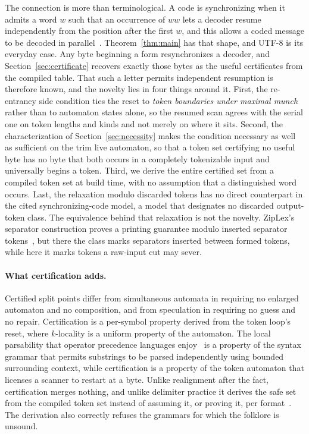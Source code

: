 \documentclass[11pt,a4paper]{article}
\theoremstyle{definition}
\theoremstyle{plain}
\begin{document}
The connection is more than terminological. A code is synchronizing when it admits a word $w$ such that an occurrence of
$ww$ lets a decoder resume independently from the position after the first $w$, and this allows a coded message to be
decoded in parallel~\cite{berlinkov2021partial}. Theorem~\ref{thm:main} has that shape, and UTF-8 is its everyday case.
Any byte beginning a form resynchronizes a decoder, and Section~\ref{sec:certificate} recovers exactly those bytes as
the useful certificates from the compiled table. That such a letter permits independent resumption is therefore known,
and the novelty lies in four things around it. First, the re-entrancy side condition ties the reset to
\emph{token boundaries under maximal munch} rather than to automaton states alone, so the resumed scan agrees with the
serial one on token lengths and kinds and not merely on where it sits. Second, the characterization of
Section~\ref{sec:necessity} makes the condition necessary as well as sufficient on the trim live automaton, so that a
token set certifying no useful byte has no byte that both occurs in a completely tokenizable input and universally
begins a token. Third, we derive the entire certified set from a compiled token set at build time, with no assumption
that a distinguished word occurs. Last, the relaxation modulo discarded tokens has no direct counterpart in the cited
synchronizing-code model, a model that designates no discarded output-token class. The equivalence behind that
relaxation is not the novelty. ZipLex's separator construction proves a printing guarantee modulo inserted separator
tokens~\cite{chassot2026ziplex}, but there the class marks separators inserted between formed tokens, while here it
marks tokens a raw-input cut may sever.

\paragraph{What certification adds.} Certified split points differ from simultaneous automata in requiring no enlarged
automaton and no composition, and from speculation in requiring no guess and no repair. Certification is a per-symbol
property derived from the token loop's reset, where $k$-locality is a uniform property of the automaton. The local
parsability that operator precedence languages enjoy~\cite{barenghi2015parallel} is a property of the syntax grammar
that permits substrings to be parsed independently using bounded surrounding context, while certification is a property
of the token automaton that licenses a scanner to restart at a byte. Unlike realignment after the fact, certification
merges nothing, and unlike delimiter practice it derives the safe set from the compiled token set instead of assuming
it, or proving it, per format~\cite{ge2019csv}. The derivation also correctly refuses the grammars for which the
folklore is unsound.
\end{document}
